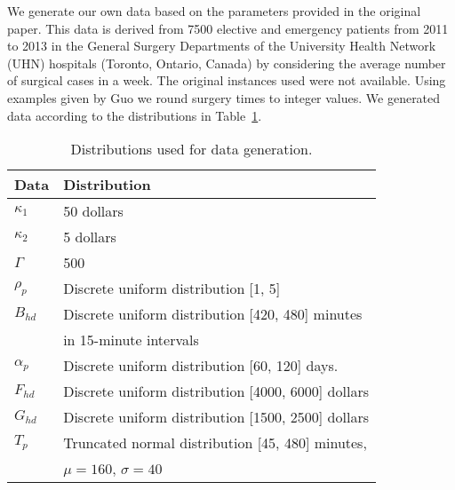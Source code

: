 We generate our own data based on the parameters provided in the original paper. This data is derived from 7500 elective and emergency patients from 2011 to 2013 in the General Surgery Departments of the University Health Network (UHN) hospitals (Toronto, Ontario, Canada) by considering the average number of surgical cases in a week\cite{roshanaei2017propagating}. The original instances used were not available. Using examples given by Guo\cite{guo} we round surgery times to integer values. We generated data according to the distributions in Table~\ref{tab:dataDist}.

\begin{table}[H]
    \centering
    \caption{Distributions used for data generation.}\label{tab:dataDist}
    \begin{tabular}{ll} \toprule
        Data & Distribution \\\midrule
        $\kappa_1$ & 50 dollars \\
        $\kappa_2$ & 5 dollars \\
        $\Gamma$ & 500 \\
        $\rho_p$ & Discrete uniform distribution [1, 5] \\
        $B_{hd}$ & Discrete uniform distribution [420, 480] minutes  \\
        & \quad in 15-minute intervals \\
        $\alpha_p$ & Discrete uniform distribution [60, 120] days. \\
        $F_{hd}$ & Discrete uniform distribution [4000, 6000] dollars \\
        $G_{hd}$ & Discrete uniform distribution [1500, 2500] dollars \\
        $T_p$ & 
            Truncated normal distribution [45, 480] minutes, \\
        & \quad $\mu=160$, $\sigma=40$
         \\
        \bottomrule
    \end{tabular}
\end{table}